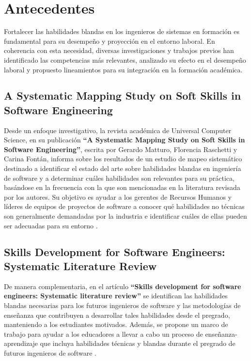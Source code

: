 \section{Antecedentes}

Fortalecer las habilidades blandas en los ingenieros de sistemas en formación es fundamental para su desempeño y proyección en el entorno laboral. En coherencia con esta necesidad, diversas investigaciones y trabajos previos han identificado las competencias más relevantes, analizado su efecto en el desempeño laboral y propuesto lineamientos para su integración en la formación académica.

\subsection{A Systematic Mapping Study on Soft Skills in Software Engineering}

Desde un enfoque investigativo, la revista académica de Universal Computer Science, en su publicación \textbf{“A Systematic Mapping Study on Soft Skills in Software Engineering”}, escrita por Gerardo Matturo, Florencia Raschetti y Carina Fontán, informa sobre los resultados de un estudio de mapeo sistemático destinado a identificar el estado del arte sobre habilidades blandas en ingeniería de software y a determinar cuáles habilidades son relevantes para su práctica, basándose en la frecuencia con la que son mencionadas en la literatura revisada por los autores. Su objetivo es ayudar a los gerentes de Recursos Humanos y líderes de equipos de proyectos de software a conocer qué habilidades no técnicas son generalmente demandadas por la industria e identificar cuáles de ellas pueden ser adecuadas para su entorno \cite{Matturro2019}.

\subsection{Skills Development for Software Engineers: Systematic Literature Review}

De manera complementaria, en el artículo \textbf{“Skills development for software engineers: Systematic literature review”} se identifican las habilidades blandas necesarias para los futuros ingenieros de software y las metodologías de enseñanza que contribuyen a desarrollar tales habilidades desde el pregrado, manteniendo a los estudiantes motivados. Además, se propone un marco de trabajo para ayudar a los educadores a llevar a cabo un proceso de enseñanza-aprendizaje que incluya habilidades técnicas y blandas durante el pregrado de futuros ingenieros de software \cite{Borges2024}.

